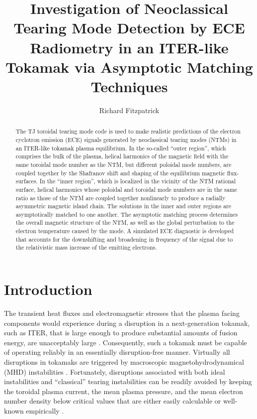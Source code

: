 \documentclass{iopjournal}
\begin{document}
\title{Investigation of Neoclassical Tearing Mode Detection by ECE Radiometry in  an ITER-like Tokamak via Asymptotic Matching Techniques}
\author{Richard Fitzpatrick}

\begin{abstract}
The TJ toroidal tearing mode code is used to make realistic predictions of  the electron cyclotron emission (ECE) signals generated by  neoclassical
tearing modes (NTMs) in an ITER-like tokamak plasma equilibrium. In the so-called ``outer region'', which comprises the bulk of the plasma, helical
harmonics of the magnetic field with the same toroidal mode number as the NTM, but different poloidal mode numbers, are coupled together by the Shafranov shift and
shaping of the equilibrium magnetic flux-surfaces. In the ``inner region'', which is localized in the vicinity of the NTM rational surface, helical harmonics whose
poloidal and toroidal mode numbers are in the same ratio as those of the NTM are coupled together nonlinearly to produce a radially asymmetric magnetic
island chain. The solutions in the inner and outer regions are asymptotically matched to one another. The asymptotic matching process determines the
overall magnetic structure of the NTM, as well as the global  perturbation to the electron temperature caused by the mode. A simulated ECE diagnostic is developed that accounts for the
 downshifting and broadening in frequency of the signal due to the relativistic mass increase of the emitting electrons. 

\end{abstract}

\section{Introduction}
The transient heat fluxes and electromagnetic stresses that the plasma facing components would experience during a disruption in
a next-generation tokamak, such as ITER,   that is large enough to produce substantial amounts of fusion energy, are unacceptably large \cite{iter,wesson}.  Consequently, such a tokamak must be capable of  operating reliably in an essentially disruption-free manner. 
Virtually all disruptions in tokamaks are triggered by macroscopic magnetohydrodynamical (MHD) instabilities \cite{jet,vries}. Fortunately, disruptions associated with both ideal instabilities   and
``classical'' tearing instabilities can   be readily avoided  by keeping the toroidal plasma current, the  mean plasma pressure, and
the mean electron number density below  critical values that are either easily calculable or well-known empirically \cite{iter,decaf}.  
\end{document}
